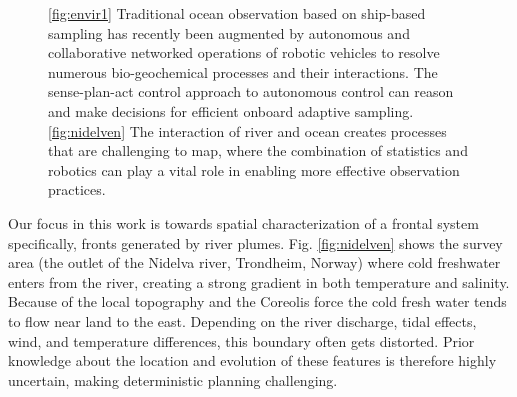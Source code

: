 \documentclass[aoas]{imsart}
\begin{document}
\begin{figure}[!b] 
  \centering 
  \hfill
  \caption{\ref{fig:envir1} Traditional ocean observation based on
    ship-based sampling has recently been augmented by autonomous and
    collaborative networked operations of robotic vehicles to resolve
    numerous bio-geochemical processes and their interactions. The
    sense-plan-act control approach to autonomous control can reason
    and make decisions for efficient onboard adaptive sampling.
    \ref{fig:nidelven} The interaction of river and ocean creates
    processes that are challenging to map, where the combination of
    statistics and robotics can play a vital role in enabling more
    effective observation practices.}
\label{fig:envir}
\end{figure}

Our focus in this work is towards spatial characterization of a
frontal system specifically, fronts generated by river
plumes. Fig. \ref{fig:nidelven} shows the survey area (the outlet of
the Nidelva river, Trondheim, Norway) where cold freshwater enters
from the river, creating a strong gradient in both temperature and
salinity. Because of the local topography and the Coreolis force
\citep{coriolis1835memoire} the cold fresh water tends to flow near
land to the east. Depending on the river discharge, tidal effects,
wind, and temperature differences, this boundary often gets
distorted. Prior knowledge about the location and evolution of these
features is therefore highly uncertain, making deterministic planning
challenging.
\end{document}
